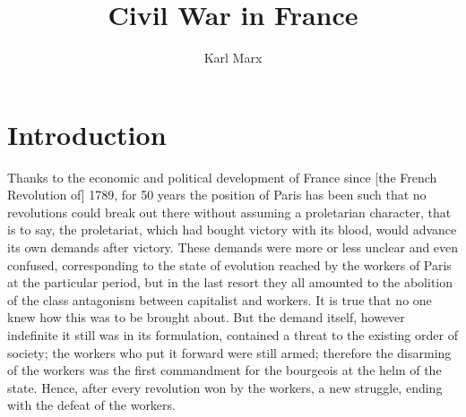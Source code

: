 \documentclass{article}
\begin{document}
\title{Civil War in France}
\author{Karl Marx}

\maketitle

\section{Introduction}

Thanks to the economic and political development of France since [the
French Revolution of] 1789, for 50 years the position of Paris has been
such that no revolutions could break out there without assuming
a proletarian character, that is to say, the proletariat, which had bought
victory with its blood, would advance its own demands after victory. These
demands were more or less unclear and even confused, corresponding to the
state of evolution reached by the workers of Paris at the particular
period, but in the last resort they all amounted to the abolition of the
class antagonism between capitalist and workers. It is true that no one
knew how this was to be brought about. But the demand itself, however
indefinite it still was in its formulation, contained a threat to the
existing order of society; the workers who put it forward were still
armed; therefore the disarming of the workers was the first commandment
for the bourgeois at the helm of the state. Hence, after every revolution
won by the workers, a new struggle, ending with the defeat of the workers.
\end{document}
